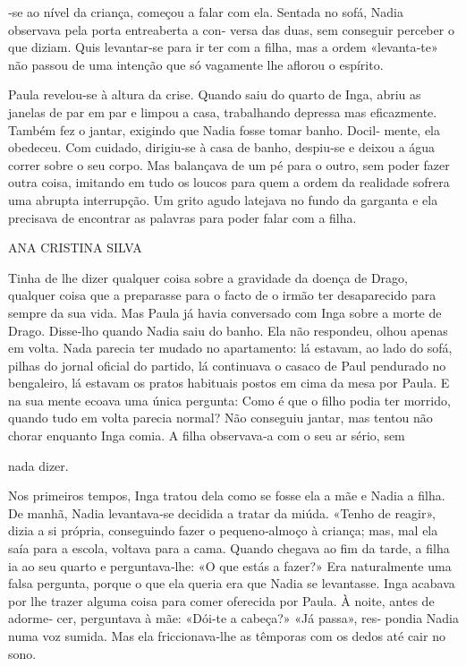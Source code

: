 ‑se ao nível da criança, começou a falar com ela. Sentada no sofá, Nadia
observava pela porta entreaberta a con‑ versa das duas, sem conseguir
perceber o que diziam. Quis levantar‑se para ir ter com a filha, mas a
ordem «levanta‑te» não passou de uma intenção que só vagamente lhe
aflorou o espírito.

Paula revelou‑se à altura da crise. Quando saiu do quarto de Inga, abriu
as janelas de par em par e limpou a casa, trabalhando depressa mas
eficazmente. Também fez o jantar, exigindo que Nadia fosse tomar banho.
Docil‑ mente, ela obedeceu. Com cuidado, dirigiu‑se à casa de banho,
despiu‑se e deixou a água correr sobre o seu corpo. Mas balançava de um
pé para o outro, sem poder fazer outra coisa, imitando em tudo os loucos
para quem a ordem da realidade sofrera uma abrupta interrupção. Um grito
agudo latejava no fundo da garganta e ela precisava de encontrar as
palavras para poder falar com a filha.

ANA CRISTINA SILVA

Tinha de lhe dizer qualquer coisa sobre a gravidade da doença de Drago,
qualquer coisa que a preparasse para o facto de o irmão ter desaparecido
para sempre da sua vida. Mas Paula já havia conversado com Inga sobre a
morte de Drago. Disse‑lho quando Nadia saiu do banho. Ela não respondeu,
olhou apenas em volta. Nada parecia ter mudado no apartamento: lá
estavam, ao lado do sofá, pilhas do jornal oficial do partido, lá
continuava o casaco de Paul pendurado no bengaleiro, lá estavam os
pratos habituais postos em cima da mesa por Paula. E na sua mente ecoava
uma única pergunta: Como é que o filho podia ter morrido, quando tudo em
volta parecia normal? Não conseguiu jantar, mas tentou não chorar
enquanto Inga comia. A filha observava‑a com o seu ar sério, sem

nada dizer.

Nos primeiros tempos, Inga tratou dela como se fosse ela a mãe e Nadia a
filha. De manhã, Nadia levantava‑se decidida a tratar da miúda. «Tenho
de reagir», dizia a si própria, conseguindo fazer o pequeno‑almoço à
criança; mas, mal ela saía para a escola, voltava para a cama. Quando
chegava ao fim da tarde, a filha ia ao seu quarto e perguntava‑lhe: «O
que estás a fazer?» Era naturalmente uma falsa pergunta, porque o que
ela queria era que Nadia se levantasse. Inga acabava por lhe trazer
alguma coisa para comer oferecida por Paula. À noite, antes de adorme‑
cer, perguntava à mãe: «Dói‑te a cabeça?» «Já passa», res‑ pondia Nadia
numa voz sumida. Mas ela friccionava‑lhe as têmporas com os dedos até
cair no sono.

